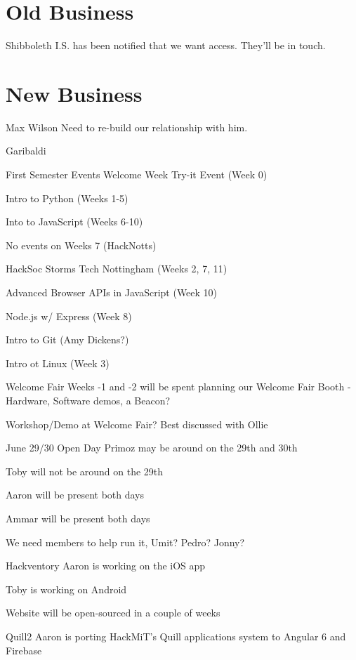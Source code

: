 \documentclass[11pt,hacksoc]{meetingmins}
\begin{document}
\section{Old Business}
\begin{items}
	\item
	Shibboleth
		\subitem
		I.S. has been notified that we want access. They'll be in touch.
\end{items}

\section{New Business}
\begin{items}
	\item
	Max Wilson
		\subitem
		Need to re-build our relationship with him.
	
	\item
	Garibaldi
	
	\item
	First Semester Events
		\subitem
		Welcome Week Try-it Event (Week 0)
		
		\subitem
		Intro to Python (Weeks 1-5)
		
		\subitem
		Into to JavaScript (Weeks 6-10)
		
		\subitem
		No events on Weeks 7 (HackNotts)
		
		\subitem
		HackSoc Storms Tech Nottingham (Weeks 2, 7, 11)
		
		\subitem
		Advanced Browser APIs in JavaScript (Week 10)
		
		\subitem
		Node.js w/ Express (Week 8)
		
		\subitem
		Intro to Git (Amy Dickens?)
		
		\subitem
		Intro ot Linux (Week 3)
	
	\item
	Welcome Fair
		\subitem
		Weeks -1 and -2 will be spent planning our Welcome Fair Booth - Hardware, Software demos, a Beacon?
		
		\subitem
		Workshop/Demo at Welcome Fair? Best discussed with Ollie
	
	\item
	June 29/30 Open Day
		\subitem
		Primoz may be around on the 29th and 30th
		
		\subitem
		Toby will not be around on the 29th
		
		\subitem
		Aaron will be present both days
		
		\subitem
		Ammar will be present both days
		
		\subitem
		We need members to help run it, Umit? Pedro? Jonny?
	
	\item
	Hackventory
		\subitem
		Aaron is working on the iOS app
		
		\subitem
		Toby is working on Android
		
		\subitem
		Website will be open-sourced in a couple of weeks
	
	\item
	Quill2
		\subitem
		Aaron is porting HackMiT's Quill applications system to Angular 6 and Firebase
	
\end{items}

\vspace{1em}
\end{document}
